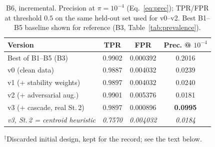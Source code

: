 \documentclass[conference]{IEEEtran}
\begin{document}
\begin{table}[t]
\caption{B6, incremental. Precision at $\pi=10^{-4}$ (Eq.~\eqref{eq:prec});
TPR/FPR at threshold $0.5$ on the same held-out set used for v0--v2.
Best B1--B5 baseline shown for reference (B3, Table~\ref{tab:prevalence}).}
\label{tab:b6}
\centering\footnotesize
\begin{tabular}{@{}lccc@{}}
\toprule
\textbf{Version} & \textbf{TPR} & \textbf{FPR} & \textbf{Prec. @ $10^{-4}$}\\
\midrule
Best of B1--B5 (B3) & 0.9902 & 0.000392 & 0.2016\\
\midrule
v0 (clean data)          & 0.9887 & 0.004032 & 0.0239\\
v1 (+ stability weights) & 0.9897 & 0.004032 & 0.0240\\
v2 (+ adversarial aug.)  & 0.9901 & 0.005376 & 0.0181\\
v3 (+ cascade, real St.\,2) & 0.9897 & 0.000896 & \textbf{0.0995}\\
\midrule
\textit{v3, St.\,2 = centroid heuristic\rlap{$^\dagger$}} & \textit{0.7570} & \textit{0.004032} & \textit{0.0184}\\
\bottomrule
\end{tabular}
\vspace{2pt}
\raggedright\scriptsize
$^\dagger$Discarded initial design, kept for the record; see the text
below.
\end{table}
\end{document}
